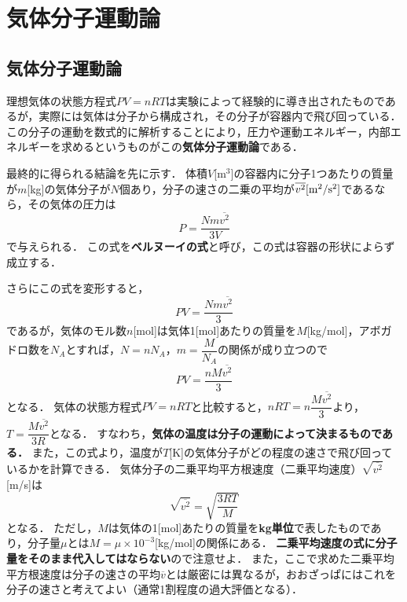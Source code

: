 \section{気体分子運動論}

\setcounter{nombre}{4}

\subsection{気体分子運動論}

理想気体の状態方程式$PV=nRT$は実験によって経験的に導き出されたものであるが，実際には気体は分子から構成され，その分子が容器内で飛び回っている．
この分子の運動を数式的に解析することにより，圧力や運動エネルギー，内部エネルギーを求めるというものがこの{\bf 気体分子運動論}である．

最終的に得られる結論を先に示す．
体積$V$[m$^3$]の容器内に分子1つあたりの質量が$m$[kg]の気体分子が$N$個あり，分子の速さの二乗の平均が$\overline{v^2} [{\rm m^2/s^2}]$であるなら，その気体の圧力は
\[P=\dfrac{Nm\overline{v^2}}{3V} \]
で与えられる．
この式を{\bf ベルヌーイの式}と呼び，この式は容器の形状によらず成立する．

さらにこの式を変形すると，
\[PV=\dfrac{Nm\overline{v^2}}{3}\]
であるが，気体のモル数$n$[mol]は気体1[mol]あたりの質量を$M$[kg/mol]，アボガドロ数を$N_A$とすれば，$N=nN_A$，$m=\dfrac{M}{N_A}$の関係が成り立つので
\[ PV=\dfrac{nM\overline{v^2}}{3}\]
となる．
気体の状態方程式$PV=nRT$と比較すると，$nRT=n\dfrac{M\overline{v^2}}{3}$より，$T=\dfrac{M\overline{v^2}}{3R}$となる．
すなわち，{\bf 気体の温度は分子の運動によって決まるものである．}
また，この式より，温度が$T$[K]の気体分子がどの程度の速さで飛び回っているかを計算できる．
気体分子の二乗平均平方根速度（二乗平均速度）$\sqrt{\overline{v^2}}$[m/s]は
\[ \sqrt{\overline{v^2}} =\sqrt{\dfrac{3RT}{M}} \]
となる．
ただし，$M$は気体の1[mol]あたりの質量を{\bf kg単位}で表したものであり，分子量$\mu$とは$M=\mu \times 10^{-3}$[kg/mol]の関係にある．
{\bf 二乗平均速度の式に分子量をそのまま代入してはならない}ので注意せよ．
また，ここで求めた二乗平均平方根速度は分子の速さの平均$\overline{v}$とは厳密には異なるが，おおざっぱにはこれを分子の速さと考えてよい（通常1割程度の過大評価となる）．

